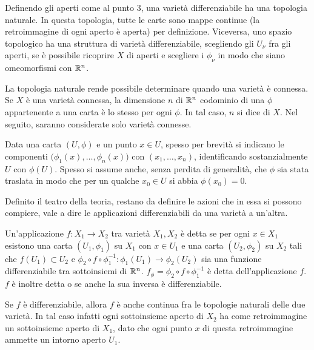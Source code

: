 \begin{remark}
  Definendo gli aperti come al punto $3$, una varietà differenziabile ha una topologia naturale. In questa topologia, tutte le carte sono mappe continue (la retroimmagine di ogni aperto è aperta) per definizione. Viceversa, uno spazio topologico ha una struttura di varietà differenziabile, scegliendo gli $U_{\nu}$ fra gli aperti, se è possibile ricoprire $X$ di aperti e scegliere i $\phi_{\nu}$ in modo che siano omeomorfismi con $\mathbb{R}^{n}$.
\end{remark}
\begin{remark}
  La topologia naturale rende possibile determinare quando una varietà è connessa. Se $X$ è una varietà connessa, la dimensione $n$ di $\mathbb{R}^{n}$ codominio di una $\phi$ appartenente a una carta è lo stesso per ogni $\phi$. In tal caso, $n$ si dice  di $X$. Nel seguito, saranno considerate solo varietà connesse.
\end{remark}

Data una carta $(U,\phi)$ e un punto $x \in U$, spesso per brevità si indicano le componenti $\big(\phi_1(x), \ldots, \phi_{n}(x)\big)$ con $(x_1, \ldots, x_n)$, identificando sostanzialmente $U$ con $\phi(U)$. Spesso si assume anche, senza perdita di generalità, che $\phi$ sia stata traslata in modo che per un qualche $x_0 \in  U$ si abbia $\phi(x_0) = 0$. 

Definito il teatro della teoria, restano da definire le azioni che in essa si possono compiere, vale a dire le applicazioni differenziabili da una varietà a un'altra.
\begin{definition}
  Un'applicazione $f:X_1 \to X_2$ tra varietà $X_1, X_2$ è detta  se per ogni $x \in  X_1$ esistono una carta $(U_1, \phi_1)$ su $X_1$ con $x \in U_1$ e una carta $(U_2, \phi_2)$ su $X_2$ tali che $f(U_1) \subset U_2$ e $\phi_2 \circ f \circ \phi_1^{-1}: \phi_1(U_1) \to \phi_2(U_2)$ sia una funzione differenziabile tra sottoinsiemi di $\mathbb{R}^{n}$. $f_{\phi} = \phi_2 \circ f \circ \phi_1^{-1}$ è detta  dell'applicazione $f$. $f$ è inoltre detta  o  se anche la sua inversa è differenziabile.
\end{definition}
\begin{remark}
  Se $f$ è differenziabile, allora $f$ è anche continua fra le topologie naturali delle due varietà. In tal caso infatti ogni sottoinsieme aperto di $X_2$ ha come retroimmagine un sottoinsieme aperto di $X_1$, dato che ogni punto $x$ di questa retroimmagine ammette un intorno aperto $U_1$.
\end{remark}

